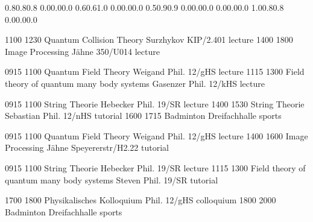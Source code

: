 \documentclass[
    landscape,a4paper,10pt
]{report}
\begin{document}
\thispagestyle{empty}

\setslotsize{4.3cm}{0.35cm}
\setbottomspace{1.5ex}

   {0.8}{0.8}{0.8} {0.0}{0.0}{0.0}
  {0.6}{0.6}{1.0} {0.0}{0.0}{0.0}
    {0.5}{0.9}{0.9} {0.0}{0.0}{0.0}
 {0.0}{0.0}{0.0}
  {1.0}{0.8}{0.8} {0.0}{0.0}{0.0}


\begin{center}
\begin{timetable}
   {1100} {1230} {Quantum Collision Theory}                         {Surzhykov}         {KIP/2.401}         {lecture}
   {1400} {1800} {Image Processing}                                 {Jähne}             {350/U014}          {lecture}

   {0915} {1100} {Quantum Field Theory}                             {Weigand}           {Phil. 12/gHS}      {lecture}
   {1115} {1300} {Field theory of quantum many body systems}        {Gasenzer}          {Phil. 12/kHS}      {lecture}


   {0915} {1100} {String Theorie}                                   {Hebecker}          {Phil. 19/SR}       {lecture}
   {1400} {1530} {String Theorie}                                   {Sebastian}         {Phil. 12/nHS}      {tutorial}
   {1600} {1715} {Badminton}                                        {}                  {Dreifachhalle}     {sports}
 
   {0915} {1100} {Quantum Field Theory}                             {Weigand}           {Phil. 12/gHS}      {lecture}
   {1400} {1600} {Image Processing}                                 {Jähne}             {Speyererstr/H2.22} {tutorial}

   {0915} {1100} {String Theorie}                                   {Hebecker}          {Phil. 19/SR}       {lecture}
   {1115} {1300} {Field theory of quantum many body systems}        {Steven}            {Phil. 19/SR}       {tutorial}

   {1700} {1800} {Physikalisches Kolloquium}                        {}                  {Phil. 12/gHS}      {colloquium}
   {1800} {2000} {Badminton}                                        {}                  {Dreifachhalle}     {sports}
\end{timetable}
\end{center}
\end{document}
